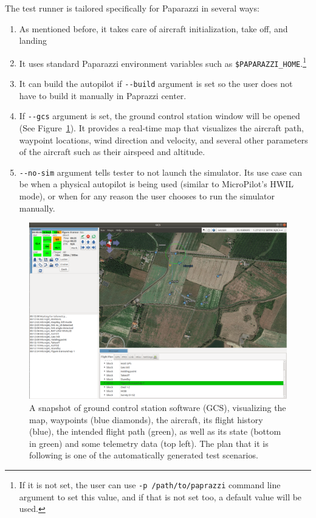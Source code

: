 The test runner is tailored specifically for Paparazzi in several ways:
\begin{enumerate}
    \item %
As mentioned before, it takes care of aircraft initialization, take off, and landing
    \item %
It uses standard Paparazzi environment variables such as \verb|$PAPARAZZI_HOME|.\footnote{If it is not set, the user can use \texttt{-p /path/to/paprazzi} command line argument to set this value, and if that is not set too, a default value will be used.} 
    \item %
It can build the autopilot if \verb|--build| argument is set so the user does not have to build it manually in Paprazzi center. 

    \item %
If \verb|--gcs| argument is set, the ground control station window will be opened (See Figure~\ref{fig:paparazzi_gcs}). It provides a real-time map that visualizes the aircraft path, waypoint locations, wind direction and velocity, and several other parameters of the aircraft such as their airspeed and altitude. 
    \item %
\verb|--no-sim| argument tells tester to not launch the simulator. Its use case can be when a physical autopilot is being used (similar to MicroPilot's HWIL mode), or when for any reason the user chooses to run the simulator manually. 
\end{enumerate}

\begin{figure}[t]
    \centering
    \includegraphics[width=\textwidth]{pprz_tester_files/GCS.png}
    \caption{A snapshot of ground control station software (GCS), visualizing the map, waypoints (blue diamonds), the aircraft, its flight history (blue), the intended flight path (green), as well as its state (bottom in green) and some telemetry data (top left). The plan that it is following is one of the automatically generated test scenarios.}
    \label{fig:paparazzi_gcs}
\end{figure}

